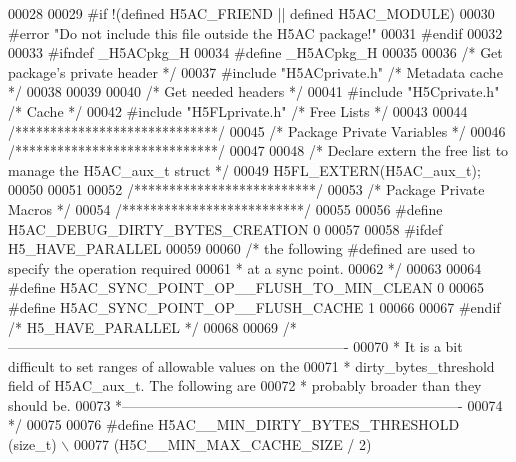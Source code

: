 \begin{DoxyCode}
00028 
00029 \textcolor{preprocessor}{#if !(defined H5AC\_FRIEND || defined H5AC\_MODULE)}
00030 \textcolor{preprocessor}{#error "Do not include this file outside the H5AC package!"}
00031 \textcolor{preprocessor}{#endif}
00032 
00033 \textcolor{preprocessor}{#ifndef \_H5ACpkg\_H}
00034 \textcolor{preprocessor}{#define \_H5ACpkg\_H}
00035 
00036 \textcolor{comment}{/* Get package's private header */}
00037 \textcolor{preprocessor}{#include "H5ACprivate.h"}    \textcolor{comment}{/* Metadata cache           */}
00038 
00039 
00040 \textcolor{comment}{/* Get needed headers */}
00041 \textcolor{preprocessor}{#include "H5Cprivate.h"}         \textcolor{comment}{/* Cache                                */}
00042 \textcolor{preprocessor}{#include "H5FLprivate.h"}        \textcolor{comment}{/* Free Lists                           */}
00043 
00044 \textcolor{comment}{/*****************************/}
00045 \textcolor{comment}{/* Package Private Variables */}
00046 \textcolor{comment}{/*****************************/}
00047 
00048 \textcolor{comment}{/* Declare extern the free list to manage the H5AC\_aux\_t struct */}
00049 H5FL\_EXTERN(H5AC\_aux\_t);
00050 
00051 
00052 \textcolor{comment}{/**************************/}
00053 \textcolor{comment}{/* Package Private Macros */}
00054 \textcolor{comment}{/**************************/}
00055 
00056 \textcolor{preprocessor}{#define H5AC\_DEBUG\_DIRTY\_BYTES\_CREATION 0}
00057 
00058 \textcolor{preprocessor}{#ifdef H5\_HAVE\_PARALLEL}
00059 
00060 \textcolor{comment}{/* the following #defined are used to specify the operation required}
00061 \textcolor{comment}{ * at a sync point.}
00062 \textcolor{comment}{ */}
00063 
00064 \textcolor{preprocessor}{#define H5AC\_SYNC\_POINT\_OP\_\_FLUSH\_TO\_MIN\_CLEAN      0}
00065 \textcolor{preprocessor}{#define H5AC\_SYNC\_POINT\_OP\_\_FLUSH\_CACHE         1}
00066 
00067 \textcolor{preprocessor}{#endif }\textcolor{comment}{/* H5\_HAVE\_PARALLEL */}\textcolor{preprocessor}{}
00068 
00069 \textcolor{comment}{/*-------------------------------------------------------------------------}
00070 \textcolor{comment}{ *  It is a bit difficult to set ranges of allowable values on the}
00071 \textcolor{comment}{ *  dirty\_bytes\_threshold field of H5AC\_aux\_t.  The following are}
00072 \textcolor{comment}{ *  probably broader than they should be.}
00073 \textcolor{comment}{ *-------------------------------------------------------------------------}
00074 \textcolor{comment}{ */}
00075 
00076 \textcolor{preprocessor}{#define H5AC\_\_MIN\_DIRTY\_BYTES\_THRESHOLD     (size\_t) \(\backslash\)}
00077 \textcolor{preprocessor}{                        (H5C\_\_MIN\_MAX\_CACHE\_SIZE / 2)}

\end{DoxyCode}
